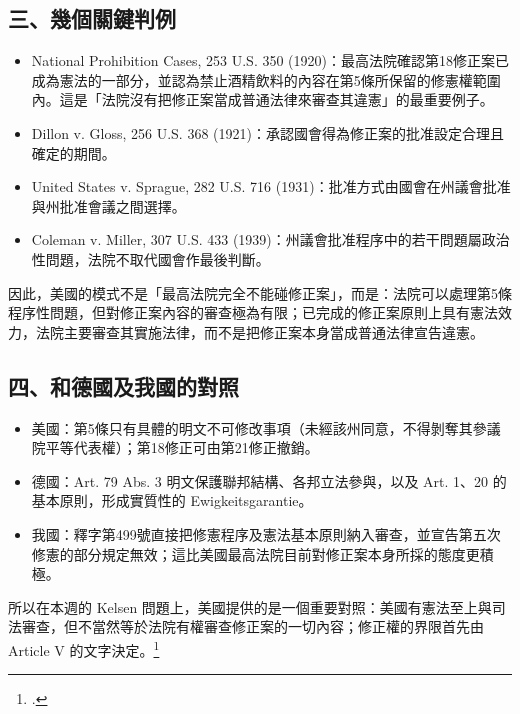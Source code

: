 \subsection{三、幾個關鍵判例}

\begin{itemize}
\tightlist
\item
  National Prohibition Cases, 253 U.S. 350 (1920)：最高法院確認第18修正案已成為憲法的一部分，並認為禁止酒精飲料的內容在第5條所保留的修憲權範圍內。這是「法院沒有把修正案當成普通法律來審查其違憲」的最重要例子。
\item
  Dillon v. Gloss, 256 U.S. 368 (1921)：承認國會得為修正案的批准設定合理且確定的期間。
\item
  United States v. Sprague, 282 U.S. 716 (1931)：批准方式由國會在州議會批准與州批准會議之間選擇。
\item
  Coleman v. Miller, 307 U.S. 433 (1939)：州議會批准程序中的若干問題屬政治性問題，法院不取代國會作最後判斷。
\end{itemize}

因此，美國的模式不是「最高法院完全不能碰修正案」，而是：法院可以處理第5條程序性問題，但對修正案內容的審查極為有限；已完成的修正案原則上具有憲法效力，法院主要審查其實施法律，而不是把修正案本身當成普通法律宣告違憲。

\subsection{四、和德國及我國的對照}

\begin{itemize}
\tightlist
\item
  美國：第5條只有具體的明文不可修改事項（未經該州同意，不得剝奪其參議院平等代表權）；第18修正可由第21修正撤銷。
\item
  德國：Art. 79 Abs. 3 明文保護聯邦結構、各邦立法參與，以及 Art. 1、20 的基本原則，形成實質性的 Ewigkeitsgarantie。
\item
  我國：釋字第499號直接把修憲程序及憲法基本原則納入審查，並宣告第五次修憲的部分規定無效；這比美國最高法院目前對修正案本身所採的態度更積極。
\end{itemize}

所以在本週的 Kelsen 問題上，美國提供的是一個重要對照：美國有憲法至上與司法審查，但不當然等於法院有權審查修正案的一切內容；修正權的界限首先由 Article V 的文字決定。\footcites{conan-artV1}{conan-artV5}{conan-amdt18-6}


